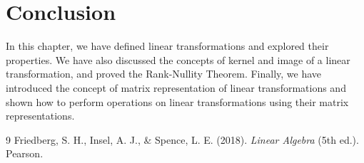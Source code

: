 \documentclass[12pt, a4paper]{article}
\theoremstyle{definition}
\theoremstyle{remark}
\begin{document}
\section{Conclusion}
In this chapter, we have defined linear transformations and explored their properties. We have also discussed the concepts of kernel and image of a linear transformation, and proved the Rank-Nullity Theorem. Finally, we have introduced the concept of matrix representation of linear transformations and shown how to perform operations on linear transformations using their matrix representations.

\begin{thebibliography}{9}
    Friedberg, S. H., Insel, A. J., \& Spence, L. E. (2018). \textit{Linear Algebra} (5th ed.). Pearson.
\end{thebibliography}
\end{document}
